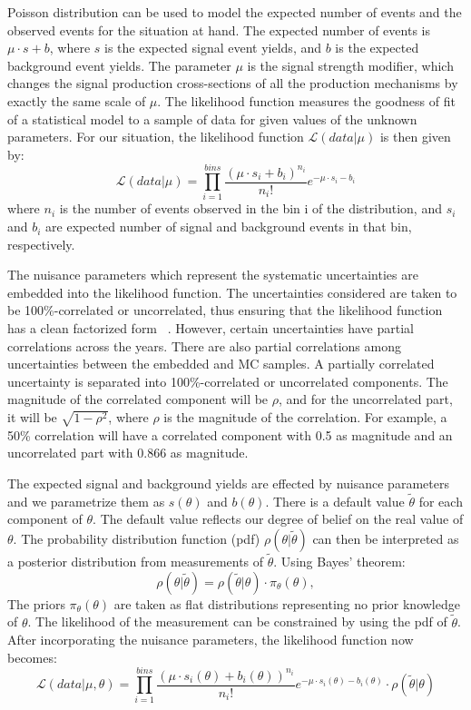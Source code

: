 Poisson distribution can be used to model the expected number of events and the observed events for the situation at hand. The expected number of events is $\mu\cdot s + b$, where $s$ is the expected signal event yields, and $b$ is the expected background event yields. The parameter $\mu$ is the signal strength modifier, which changes the signal production cross-sections of all the production mechanisms by exactly the same scale of $\mu$. The likelihood function measures the goodness of fit of a statistical model to a sample of data for given values of the unknown parameters. For our situation, the likelihood function $\mathcal{L}(data|\mu)$ is then given by:
\begin{equation}
  \mathcal{L}(data|\mu)=\prod_{i=1}^{bins}\frac{(\mu\cdot s_i + b_i)^{n_i}}{n_{i}!}e^{-\mu\cdot s_i - b_i}
\end{equation}
where $n_i$ is the number of events observed in the bin i of the distribution, and $s_i$ and $b_i$ are expected number of signal and background events in that bin, respectively.

The nuisance parameters which represent the systematic uncertainties are embedded into the likelihood function. The uncertainties considered are taken to be 100\%-correlated or uncorrelated, thus ensuring that the likelihood function has a clean factorized form ~\cite{ATLAS:2011tau}. However, certain uncertainties have partial correlations across the years. There are also partial correlations among uncertainties between the embedded and MC samples. A partially correlated uncertainty is separated into 100\%-correlated or uncorrelated components.
The magnitude of the correlated component will be $\rho$, and for the uncorrelated part, it will be $\sqrt{1-\rho^{2}}$, where $\rho$ is the magnitude of the correlation. For example, a 50\% correlation will have a correlated component with 0.5 as magnitude and an uncorrelated part with 0.866 as magnitude.

The expected signal and background yields are effected by nuisance parameters and we parametrize them as $s(\theta)$ and $b(\theta)$. There is a default value $\tilde{\theta}$ for each component of $\theta$. The default value reflects our degree of belief on the real value of $\theta$. The probability distribution function (pdf) $\rho(\theta|\tilde{\theta})$ can then be interpreted as a posterior distribution from measurements of $\tilde{\theta}$. Using Bayes' theorem:
\begin{equation}
  \rho(\theta|\tilde{\theta})=\rho(\tilde{\theta}|\theta)\cdot\pi_\theta(\theta),
\end{equation}
The priors $\pi_\theta(\theta)$ are taken as flat distributions representing no prior knowledge of $\theta$. The likelihood of the measurement can be constrained by using the pdf of $\tilde{\theta}$. After incorporating the nuisance parameters, the likelihood function now becomes:
\begin{equation}
  \mathcal{L}(data|\mu,\theta)=\prod_{i=1}^{bins}\frac{(\mu\cdot s_i(\theta) + b_i(\theta))^{n_i}}{n_{i}!}e^{-\mu\cdot s_i(\theta) - b_i(\theta)}\cdot\rho(\tilde{\theta}|\theta)
\end{equation}

